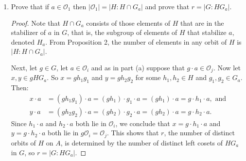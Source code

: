 \documentclass{article}
\begin{document}
\begin{enumerate}[itemsep=0em, label=(\alph*)]
\begin{proof}
            Thus for each $g \in G$ and each $i \in \{ 1, ..., r \}$ there is a $j$ such that $g\mathcal{O}_i = \mathcal{O}_j$. This further implies that all orbits of a normal subgroup have the same cardinality, since $g\mathcal{O}_i = \mathcal{O}_j$ implies that $|\mathcal{O}_i| = |\mathcal{O}_j|$.
        \end{proof}
    \item Prove that if $a \in \mathcal{O}_1$ then $|\mathcal{O}_1| = |H:H \cap G_a|$ and prove that \newline $r = |G:HG_a|$.
        \begin{proof}
            Note that $H \cap G_a$ consists of those elements of $H$ that are in the stabilizer of $a$ in $G$, that is, the subgroup of elements of $H$ that stabilize $a$, denoted $H_a$. From Proposition 2, the number of elements in any orbit of $H$ is $|H:H \cap G_a|$.

            Next, let $g \in G$, let $a \in \mathcal{O}_i$ and as in part (a) suppose that $g \cdot a \in \mathcal{O}_j$. Now let $x, y \in gHG_a$. So $x = gh_1g_1$ and $y = gh_2g_2$ for some $h_1, h_2 \in H$ and $g_1, g_2 \in G_a$. Then:
            \begin{align*}
                x \cdot a &= (gh_1g_1) \cdot a = (gh_1) \cdot g_1 \cdot a = (gh_1) \cdot a = g \cdot h_1 \cdot a, \text{ and} \\
                y \cdot a &= (gh_2g_2) \cdot a = (gh_2) \cdot g_2 \cdot a = (gh_2) \cdot a = g \cdot h_2 \cdot a.
            \end{align*}
            Since $h_1 \cdot a$ and $h_2 \cdot a$ both lie in $\mathcal{O}_i$, we conclude that $x = g \cdot h_1 \cdot a$ and $y = g \cdot h_2 \cdot a$ both lie in $g\mathcal{O}_i = \mathcal{O}_j$. This shows that $r$, the number of distinct orbits of $H$ on $A$, is determined by the number of distinct left cosets of $HG_a$ in $G$, so $r = |G:HG_a|$.
        \end{proof}
\end{enumerate}


            
\end{document}

